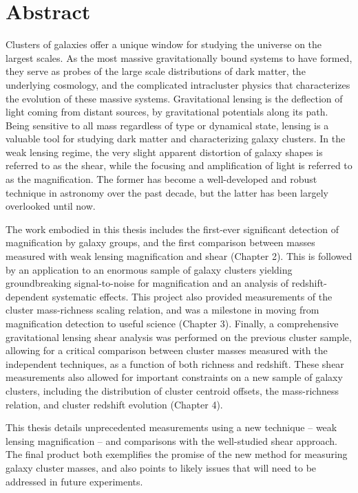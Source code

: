 
\chapter{Abstract}

Clusters of galaxies offer a unique window for studying the universe on the largest scales. As the most massive gravitationally bound systems to have formed, they serve as probes of the large scale distributions of dark matter, the underlying cosmology, and the complicated intracluster physics that characterizes the evolution of these massive systems. Gravitational lensing is the deflection of light coming from distant sources, by gravitational potentials along its path. Being sensitive to all mass regardless of type or dynamical state, lensing is a valuable tool for studying dark matter and characterizing galaxy clusters. In the weak lensing regime, the very slight apparent distortion of galaxy shapes is referred to as the shear, while the focusing and amplification of light is referred to as the magnification. The former has become a well-developed and robust technique in astronomy over the past decade, but the latter has been largely overlooked until now.

The work embodied in this thesis includes the first-ever significant detection of magnification by galaxy groups, and the first comparison between masses measured with weak lensing magnification and shear (Chapter 2). This is followed by an application to an enormous sample of galaxy clusters yielding groundbreaking signal-to-noise for magnification and an analysis of redshift-dependent systematic effects. This project also provided measurements of the cluster mass-richness scaling relation, and was a milestone in moving from magnification detection to useful science (Chapter 3). Finally, a comprehensive gravitational lensing shear analysis was performed on the previous cluster sample, allowing for a critical comparison between cluster masses measured with the independent techniques, as a function of both richness and redshift. These shear measurements also allowed for important constraints on a new sample of galaxy clusters, including the distribution of cluster centroid offsets, the mass-richness relation, and cluster redshift evolution (Chapter 4). 

This thesis details unprecedented measurements using a new technique -- weak lensing magnification -- and comparisons with the well-studied shear approach. The final product both exemplifies the promise of the new method for measuring galaxy cluster masses, and also points to likely issues that will need to be addressed in future experiments.



